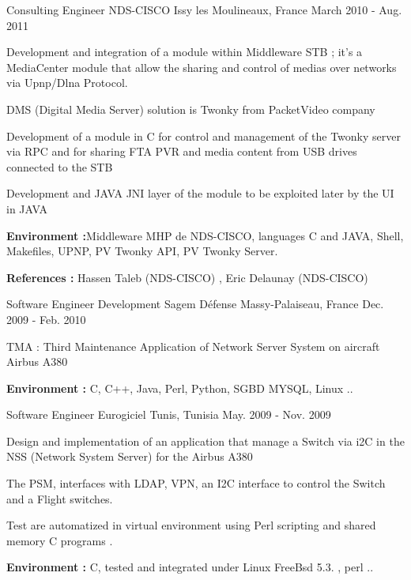 \begin{cventries}
\cventry
{Consulting Engineer} %
{NDS-CISCO} %
{Issy les Moulineaux, France} %
{March 2010 - Aug. 2011} %
{ %
\begin{cvitems}
\item {Development and integration of a module within Middleware STB ; it’s a MediaCenter module that allow the sharing and control of medias over networks via Upnp/Dlna Protocol.}
\item {DMS (Digital Media Server) solution is Twonky from PacketVideo company }
\item {Development of a module in C for control and management of the Twonky server via RPC and for sharing FTA PVR and media content from USB drives connected to the STB}
\item {Development and JAVA JNI  layer of the module to be exploited later by the UI in JAVA}
\item { \textbf{Environment :}Middleware MHP de NDS-CISCO, languages C and JAVA, Shell, Makefiles, UPNP, PV Twonky API, PV Twonky Server. }
\item { \textbf{References :} Hassen Taleb (NDS-CISCO) , Eric Delaunay (NDS-CISCO) }
\end{cvitems} 
}


\cventry
{Software Engineer Development} %
{Sagem Défense} %
{Massy-Palaiseau, France} %
{Dec. 2009 - Feb. 2010} %
{ %
\begin{cvitems}
\item {TMA : Third Maintenance Application of Network Server System on aircraft Airbus A380}
\item { \textbf{Environment :} C, C++, Java, Perl, Python, SGBD MYSQL, Linux .. }
\end{cvitems}
}


\cventry
{Software Engineer} %
{Eurogiciel} %
{Tunis, Tunisia} %
{May. 2009 - Nov. 2009} %
{ %
\begin{cvitems}
\item {Design and implementation of an application that manage a Switch via i2C in the NSS (Network System Server) for the Airbus A380}
\item {The PSM, interfaces with LDAP, VPN, an I2C interface to control the Switch and a  Flight switches.}
\item {Test are automatized in virtual environment using Perl scripting and shared memory C programs . }
\item { \textbf{Environment :} C, tested and integrated under Linux FreeBsd 5.3. , perl ..}
\end{cvitems}
}


\end{cventries}
